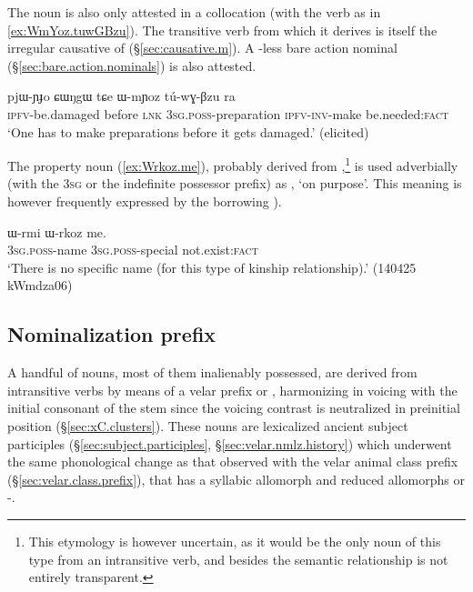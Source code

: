 The noun  is also only attested in a collocation  (with the verb  as in \ref{ex:WmYoz.tuwGBzu}). The transitive verb  from which it derives is itself the irregular causative of  (§\ref{sec:causative.m}). A -less bare action nominal  (§\ref{sec:bare.action.nominals}) is also attested.

\begin{exe}
\ex \label{ex:WmYoz.tuwGBzu}
\gll  pjɯ-ɲɟo ɕɯŋgɯ tɕe ɯ-mɲoz tú-wɣ-βzu ra \\
\textsc{ipfv}-be.damaged before \textsc{lnk} \textsc{3sg}.\textsc{poss}-preparation \textsc{ipfv}-\textsc{inv}-make be.needed:\textsc{fact} \\
\glt `One has to make preparations before it gets damaged.' (elicited)
\end{exe}
 
The property noun  (\ref{ex:Wrkoz.me}), probably derived from ,\footnote{This etymology is however uncertain, as it would be the only noun of this type from an intransitive verb, and besides the semantic relationship is not entirely transparent.  }  is used adverbially (with the \textsc{3sg} or the indefinite possessor prefix) as  , `on purpose'. This meaning is however frequently expressed by the borrowing ).

\begin{exe}
\ex \label{ex:Wrkoz.me}
\gll ɯ-rmi ɯ-rkoz me. \\
\textsc{3sg}.\textsc{poss}-name \textsc{3sg}.\textsc{poss}-special not.exist:\textsc{fact} \\
\glt `There is no specific name (for this type of kinship relationship).' (140425 kWmdza06)
\end{exe}




\subsection{Nominalization  prefix} \label{sec:G.nmlz}
A handful of nouns, most of them inalienably possessed, are derived from intransitive verbs by means of a velar prefix   or , harmonizing in voicing with the initial consonant of the stem since the voicing contrast is neutralized in preinitial position (§\ref{sec:xC.clusters}). These nouns are lexicalized ancient subject participles (§\ref{sec:subject.participles}, §\ref{sec:velar.nmlz.history}) which underwent the same phonological change as that observed with the velar animal class prefix (§\ref{sec:velar.class.prefix}), that has a syllabic allomorph  and reduced allomorphs  or -. 

